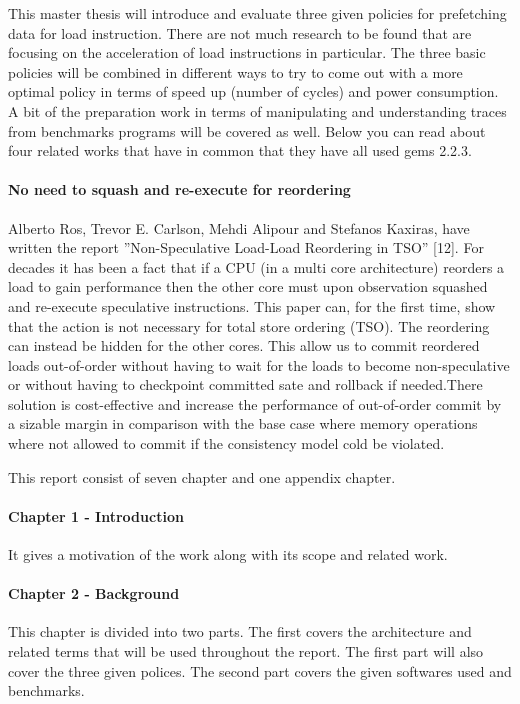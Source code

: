 This master thesis will introduce and evaluate three given policies for prefetching data
for load instruction. There are not much research to be found that are focusing on
the acceleration of load instructions in particular. The three basic policies will be
combined in different ways to try to come out with a more optimal policy in terms of
speed up (number of cycles) and power consumption. A bit of the preparation work
in terms of manipulating and understanding traces from benchmarks programs will
be covered as well.
Below you can read about four related works that have in common that they have all
used gems 2.2.3. \fixme

\paragraph{No need to squash and re-execute for reordering} Alberto Ros, Trevor E. Carlson,
Mehdi Alipour and Stefanos Kaxiras, have written the report ”Non-Speculative
Load-Load Reordering in TSO” [12]\fixme. For decades it has been a fact that if a CPU
(in a multi core architecture) reorders a load to gain performance then the other
core must upon observation squashed and re-execute speculative instructions. This
paper can, for the first time, show that the action is not necessary for total store
ordering (TSO). The reordering can instead be hidden for the other cores. This allow
us to commit reordered loads out-of-order without having to wait for the loads to
become non-speculative or without having to checkpoint committed sate and rollback
if needed.There solution is cost-effective and increase the performance of out-of-order
commit by a sizable margin in comparison with the base case where memory operations
where not allowed to commit if the consistency model cold be violated.



This report consist of seven chapter and one appendix chapter. \fixme 
\paragraph{Chapter 1 - Introduction} It gives a motivation of the work along with its scope
and related work.
\paragraph{Chapter 2 - Background} This chapter is divided into two parts. The first covers
the architecture and related terms that will be used throughout the report. The first
part will also cover the three given polices. The second part covers the given softwares
used and benchmarks.
